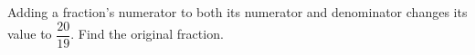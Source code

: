 Adding a fraction's numerator to both its numerator and denominator changes its value to $\dfrac{20}{19}$. Find the original fraction.

